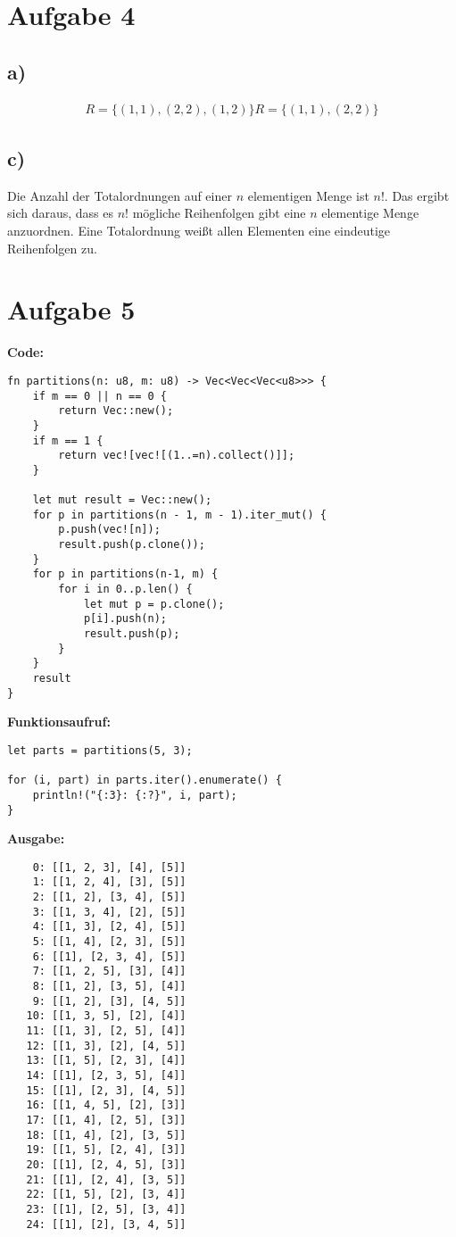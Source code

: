 \documentclass[a4paper]{scrartcl}
\begin{document}
\section*{Aufgabe 4}
\subsection*{a)}
\begin{align*}
    R = \{(1,1),(2,2),(1,2)\}
    R = \{(1,1),(2,2)\}
\end{align*}

\subsection*{c)}
Die Anzahl der Totalordnungen auf einer $n$ elementigen Menge ist $n!$. Das ergibt sich daraus, dass es $n!$ mögliche 
Reihenfolgen gibt eine $n$ elementige Menge anzuordnen. Eine Totalordnung weißt allen Elementen eine eindeutige Reihenfolgen zu.



\section*{Aufgabe 5}

\textbf{Code:}
\begin{lstlisting}
fn partitions(n: u8, m: u8) -> Vec<Vec<Vec<u8>>> {
    if m == 0 || n == 0 {
        return Vec::new();
    }
    if m == 1 {
        return vec![vec![(1..=n).collect()]];
    }

    let mut result = Vec::new();
    for p in partitions(n - 1, m - 1).iter_mut() {
        p.push(vec![n]);
        result.push(p.clone());
    }
    for p in partitions(n-1, m) {
        for i in 0..p.len() {
            let mut p = p.clone();
            p[i].push(n);
            result.push(p);
        }
    }
    result
}
\end{lstlisting}

\textbf{Funktionsaufruf:}
\begin{lstlisting}
let parts = partitions(5, 3);

for (i, part) in parts.iter().enumerate() {
    println!("{:3}: {:?}", i, part);    
}
\end{lstlisting}

\textbf{Ausgabe:}
\begin{lstlisting}
    0: [[1, 2, 3], [4], [5]]
    1: [[1, 2, 4], [3], [5]]
    2: [[1, 2], [3, 4], [5]]
    3: [[1, 3, 4], [2], [5]]
    4: [[1, 3], [2, 4], [5]]
    5: [[1, 4], [2, 3], [5]]
    6: [[1], [2, 3, 4], [5]]
    7: [[1, 2, 5], [3], [4]]
    8: [[1, 2], [3, 5], [4]]
    9: [[1, 2], [3], [4, 5]]
   10: [[1, 3, 5], [2], [4]]
   11: [[1, 3], [2, 5], [4]]
   12: [[1, 3], [2], [4, 5]]
   13: [[1, 5], [2, 3], [4]]
   14: [[1], [2, 3, 5], [4]]
   15: [[1], [2, 3], [4, 5]]
   16: [[1, 4, 5], [2], [3]]
   17: [[1, 4], [2, 5], [3]]
   18: [[1, 4], [2], [3, 5]]
   19: [[1, 5], [2, 4], [3]]
   20: [[1], [2, 4, 5], [3]]
   21: [[1], [2, 4], [3, 5]]
   22: [[1, 5], [2], [3, 4]]
   23: [[1], [2, 5], [3, 4]]
   24: [[1], [2], [3, 4, 5]]
\end{lstlisting}
\end{document}

